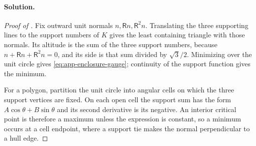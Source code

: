 \paragraph{Solution.}

\begin{proof}[Proof of ]
Fix outward unit normals $n,\mathsf Rn,\mathsf R^2n$.  Translating the three
supporting lines to the support numbers of $K$ gives the least containing
triangle with those normals.  Its altitude is the sum of the three support
numbers, because $n+\mathsf Rn+\mathsf R^2n=0$, and its side is that sum
divided by $\sqrt3/2$.  Minimizing over the unit circle gives
\eqref{eq:app-enclosure-gauge}; continuity of the support function gives the
minimum.

For a polygon, partition the unit circle into angular cells on which the
three support vertices are fixed.  On each open cell the support sum has the
form $A\cos\theta+B\sin\theta$ and its second derivative is its negative.
An interior critical point is therefore a maximum unless the expression is
constant, so a minimum occurs at a cell endpoint, where a support tie makes
the normal perpendicular to a hull edge.
\end{proof}

